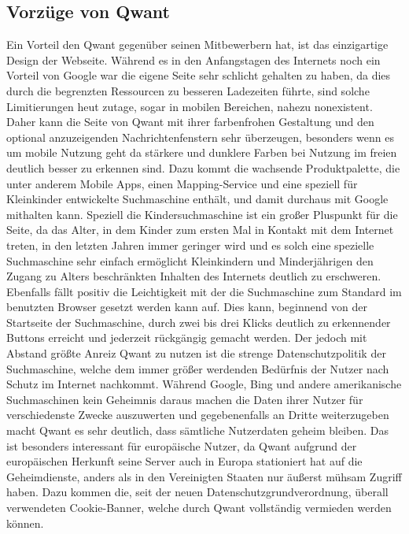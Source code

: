 \subsection{Vorzüge von Qwant}\label{subsec:vorzuge-von-qwant}
Ein Vorteil den Qwant gegenüber seinen Mitbewerbern hat, ist das einzigartige Design der Webseite.
Während es in den Anfangstagen des Internets noch ein Vorteil von Google war die eigene Seite sehr schlicht gehalten zu
haben, da dies durch die begrenzten Ressourcen zu besseren Ladezeiten führte, sind solche Limitierungen heut zutage, sogar
in mobilen Bereichen, nahezu nonexistent.
Daher kann die Seite von Qwant mit ihrer farbenfrohen Gestaltung und den optional anzuzeigenden Nachrichtenfenstern sehr
überzeugen, besonders wenn es um mobile Nutzung geht da stärkere und dunklere Farben bei Nutzung im freien deutlich besser
zu erkennen sind.
Dazu kommt die wachsende Produktpalette, die unter anderem Mobile Apps, einen Mapping-Service und eine speziell für
Kleinkinder entwickelte Suchmaschine enthält, und damit durchaus mit Google mithalten kann.
Speziell die Kindersuchmaschine ist ein großer Pluspunkt für die Seite, da das Alter, in dem Kinder zum ersten Mal in
Kontakt mit dem Internet treten, in den letzten Jahren immer geringer wird und es solch eine spezielle Suchmaschine
sehr einfach ermöglicht Kleinkindern und Minderjährigen den Zugang zu Alters beschränkten Inhalten des Internets
deutlich zu erschweren.
Ebenfalls fällt positiv die Leichtigkeit mit der die Suchmaschine zum Standard im benutzten Browser gesetzt werden kann auf.
Dies kann, beginnend von der Startseite der Suchmaschine, durch zwei bis drei Klicks deutlich zu erkennender Buttons
erreicht und jederzeit rückgängig gemacht werden.
Der jedoch mit Abstand größte Anreiz Qwant zu nutzen ist die strenge Datenschutzpolitik der Suchmaschine, welche dem
immer größer werdenden Bedürfnis der Nutzer nach Schutz im Internet nachkommt.
Während Google, Bing und andere amerikanische Suchmaschinen kein Geheimnis daraus machen die Daten ihrer Nutzer für
verschiedenste Zwecke auszuwerten und gegebenenfalls an Dritte weiterzugeben macht Qwant es sehr deutlich, dass sämtliche
Nutzerdaten geheim bleiben.
Das ist besonders interessant für europäische Nutzer, da Qwant aufgrund der europäischen Herkunft seine Server auch in Europa
stationiert hat auf die Geheimdienste, anders als in den Vereinigten Staaten nur äußerst mühsam Zugriff haben.
Dazu kommen die, seit der neuen Datenschutzgrundverordnung, überall verwendeten Cookie-Banner, welche durch Qwant
vollständig vermieden werden können.

